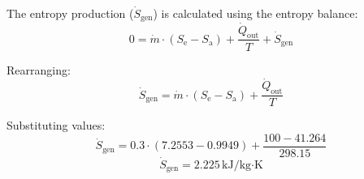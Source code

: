 The entropy production (\( \dot{S}_{\text{gen}} \)) is calculated using the entropy balance:  
\[
0 = \dot{m} \cdot (S_{\text{e}} - S_{\text{a}}) + \frac{\dot{Q}_{\text{out}}}{T} + \dot{S}_{\text{gen}}
\]  

Rearranging:  
\[
\dot{S}_{\text{gen}} = \dot{m} \cdot (S_{\text{e}} - S_{\text{a}}) + \frac{\dot{Q}_{\text{out}}}{T}
\]  

Substituting values:  
\[
\dot{S}_{\text{gen}} = 0.3 \cdot (7.2553 - 0.9949) + \frac{100 - 41.264}{298.15}
\]  
\[
\dot{S}_{\text{gen}} = 2.225 \, \text{kJ/kg·K}
\]